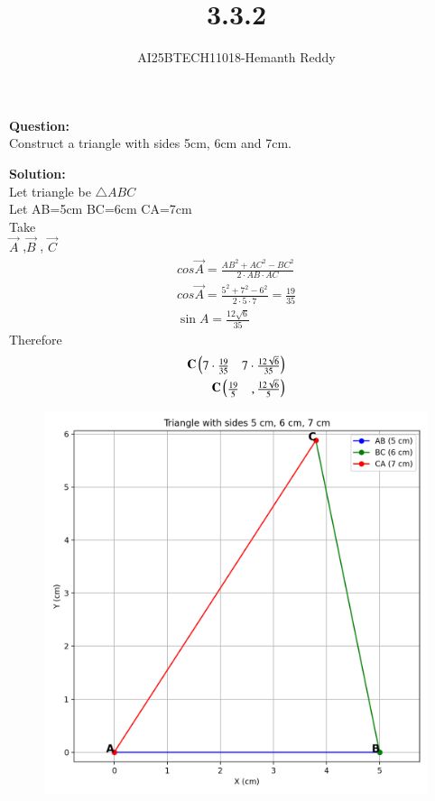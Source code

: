 \documentclass[journal]{IEEEtran}
\begin{document}

\vspace{3cm}

\title{3.3.2}
\author{AI25BTECH11018-Hemanth Reddy}
 \maketitle
{\let\newpage\relax\maketitle}

\renewcommand{\thefigure}{\theenumi}
\renewcommand{\thetable}{\theenumi}
\setlength{\intextsep}{10pt} %


\renewcommand{\thetable}{\theenumi}

\textbf{Question:}\\
Construct a triangle with sides 5cm, 6cm and 7cm. 

\textbf{Solution:}\\
Let triangle be $\triangle ABC $ \\
Let AB=5cm BC=6cm CA=7cm \\Take\\

$\vec{A}$   ,$\vec{B}$  ,  $\vec{C}$
\begin{align}
    cos \vec{A} =\frac{AB^{2}+AC^{2}-BC^{2}}{2\cdot AB\cdot AC}\\
    cos \vec{A} =\frac{5^{2}+7^{2}-6^{2}}{ 2\cdot 5\cdot 7}=\frac{19}{35}\\
           \sin A = \frac{12\sqrt{6}}{35}     
\end{align}
 Therefore
\begin{align}
    \mathbf{C}\begin{pmatrix}7\cdot \frac{19}{35} & 7\cdot \frac{12\sqrt{6}}{35} \end{pmatrix}\\
\mathbf{C}\begin{pmatrix}\frac{19}{5} & ,\frac{12\sqrt{6}}{5} \end{pmatrix}
\end{align}


\begin{figure}
    \centering
    \includegraphics[width=0.5\linewidth]{figs/triangle_5_6_7.png}
    \caption{}
    \label{fig:placeholder}
\end{figure}
\end{document}
